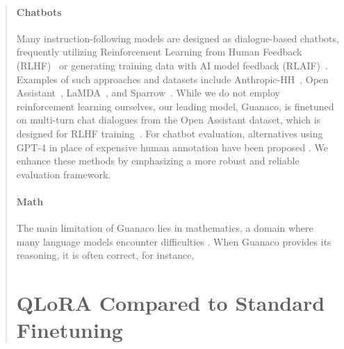 \begin{quote}
\paragraph{Chatbots} Many instruction-following models are designed as dialogue-based chatbots, frequently utilizing Reinforcement Learning from Human Feedback (RLHF)~\citep{christiano2017deep} or generating training data with AI model feedback (RLAIF)~\citep{bai2022constitutional}. Examples of such approaches and datasets include Anthropic-HH~\citep{askell2021general,bai2022training}, Open Assistant~\citep{kopf2023openassistant}, LaMDA~\citep{thoppilan2022lamda}, and Sparrow~\citep{glaese2022improving}. While we do not employ reinforcement learning ourselves, our leading model, Guanaco, is finetuned on multi-turn chat dialogues from the Open Assistant dataset, which is designed for RLHF training~\citep{kopf2023openassistant}. For chatbot evaluation, alternatives using GPT-4 in place of expensive human annotation have been proposed \citep{vicuna2023,peng2023instruction}. We enhance these methods by emphasizing a more robust and reliable evaluation framework.

\paragraph{Math} The main limitation of {Guanaco} lies in mathematics, a domain where many language models encounter difficulties \citep{liang2022holistic}. When {Guanaco} provides its reasoning, it is often correct, for instance,

\section{QLoRA Compared to Standard Finetuning}
\label{sec:comp_to_std}


\end{quote}
